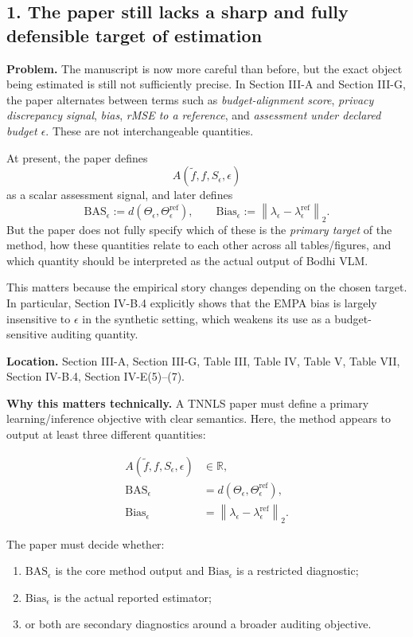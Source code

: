 \subsection*{1. The paper still lacks a sharp and fully defensible target of estimation}

\textbf{Problem.}  
The manuscript is now more careful than before, but the exact object being estimated is still not sufficiently precise. In Section III-A and Section III-G, the paper alternates between terms such as \emph{budget-alignment score}, \emph{privacy discrepancy signal}, \emph{bias}, \emph{rMSE to a reference}, and \emph{assessment under declared budget $\epsilon$}. These are not interchangeable quantities.

At present, the paper defines
\[
A(\tilde f, f, S_\epsilon, \epsilon)
\]
as a scalar assessment signal, and later defines
\[
\mathrm{BAS}_\epsilon := d\!\left(\Theta_\epsilon, \Theta_\epsilon^{\mathrm{ref}}\right),
\qquad
\mathrm{Bias}_\epsilon := \left\|\lambda_\epsilon - \lambda_\epsilon^{\mathrm{ref}}\right\|_2.
\]
But the paper does not fully specify which of these is the \emph{primary target} of the method, how these quantities relate to each other across all tables/figures, and which quantity should be interpreted as the actual output of Bodhi VLM.

This matters because the empirical story changes depending on the chosen target. In particular, Section IV-B.4 explicitly shows that the EMPA bias is largely insensitive to $\epsilon$ in the synthetic setting, which weakens its use as a budget-sensitive auditing quantity.

\textbf{Location.}  
Section III-A, Section III-G, Table III, Table IV, Table V, Table VII, Section IV-B.4, Section IV-E(5)--(7).

\textbf{Why this matters technically.}  
A TNNLS paper must define a primary learning/inference objective with clear semantics. Here, the method appears to output at least three different quantities:

\begin{align}
A(\tilde f,f,S_\epsilon,\epsilon) &\in \mathbb{R}, \\
\mathrm{BAS}_\epsilon &= d\!\left(\Theta_\epsilon,\Theta_\epsilon^{\mathrm{ref}}\right), \\
\mathrm{Bias}_\epsilon &= \left\|\lambda_\epsilon-\lambda_\epsilon^{\mathrm{ref}}\right\|_2.
\end{align}

The paper must decide whether:
\begin{enumerate}
\item $\mathrm{BAS}_\epsilon$ is the core method output and $\mathrm{Bias}_\epsilon$ is a restricted diagnostic;
\item $\mathrm{Bias}_\epsilon$ is the actual reported estimator;
\item or both are secondary diagnostics around a broader auditing objective.
\end{enumerate}

